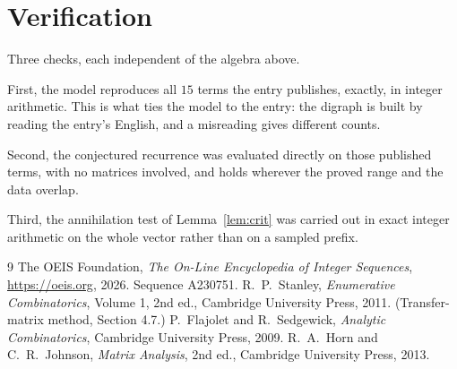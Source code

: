 \documentclass[11pt,a4paper]{article}
\theoremstyle{plain}
\theoremstyle{definition}
\begin{document}
\section{Verification}

Three checks, each independent of the algebra above.

First, the model reproduces all $15$ terms the entry publishes, exactly, in integer
arithmetic. This is what ties the model to the entry: the digraph is built by reading the
entry's English, and a misreading gives different counts.

Second, the conjectured recurrence was evaluated directly on those published terms, with no
matrices involved, and holds wherever the proved range and the data overlap.

Third, the annihilation test of Lemma~\ref{lem:crit} was carried out in exact integer
arithmetic on the whole vector rather than on a sampled prefix.

\begin{thebibliography}{9}
 The OEIS Foundation, \emph{The On-Line Encyclopedia of Integer
Sequences}, \url{https://oeis.org}, 2026. Sequence A230751.
 R.~P.~Stanley, \emph{Enumerative Combinatorics}, Volume 1, 2nd ed.,
Cambridge University Press, 2011. (Transfer-matrix method, Section 4.7.)
 P.~Flajolet and R.~Sedgewick, \emph{Analytic Combinatorics}, Cambridge
University Press, 2009.
 R.~A.~Horn and C.~R.~Johnson, \emph{Matrix Analysis}, 2nd ed., Cambridge
University Press, 2013.
\end{thebibliography}
\end{document}

